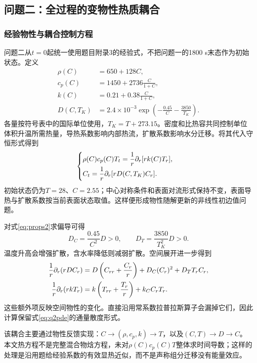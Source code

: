 \subsection{问题二：全过程的变物性热质耦合}
\subsubsection{经验物性与耦合控制方程}
问题二从$t=0$起统一使用题目附录3的经验式，不把问题一的1800 s末态作为初始状态。定义
\begin{equation}
\begin{aligned}
\rho(C)&=650+128C,\\
c_p(C)&=1450+2736\frac{C}{1+C},\\
k(C)&=0.21+0.38\frac{C}{1+C},\\
D(C,T_K)&=2.4\times10^{-3}
\exp\left(-\frac{0.45}{C}-\frac{3850}{T_K}\right).
\end{aligned}
\label{eq:props2}
\end{equation}
各量按符号表中的国际单位使用，$T_K=T+273.15$。密度和比热容共同控制单位体积升温所需热量，导热系数影响内部热流，扩散系数影响水分迁移。将其代入守恒形式得到
\begin{equation}
\begin{cases}
\rho(C)c_p(C)T_t=\dfrac1r\partial_r[rk(C)T_r],\\[4pt]
C_t=\dfrac1r\partial_r[rD(C,T_K)C_r].
\end{cases}
\label{eq:q2pde}
\end{equation}
初始状态仍为$T=28$、$C=2.55$；中心对称条件和表面对流形式保持不变，表面导热与扩散系数按当前表面状态取值。这样便形成物性随解更新的非线性初边值问题。

对式\eqref{eq:props2}求偏导可得
\begin{equation}
D_C=\frac{0.45}{C^2}D>0,\qquad
D_T=\frac{3850}{T_K^2}D>0.
\end{equation}
温度升高会增强扩散，含水率降低则减弱扩散。空间展开进一步得到
\begin{equation}
\begin{aligned}
\frac1r\partial_r(rDC_r)
&=D\left(C_{rr}+\frac{C_r}{r}\right)
+D_C(C_r)^2+D_TT_rC_r,\\
\frac1r\partial_r(rkT_r)
&=k\left(T_{rr}+\frac{T_r}{r}\right)+k_C C_rT_r .
\end{aligned}
\end{equation}
这些额外项反映空间物性的变化。直接沿用常系数拉普拉斯算子会漏掉它们，因此计算保留式\eqref{eq:q2pde}的通量散度形式。

该耦合主要通过物性反馈实现：$C\rightarrow(\rho,c_p,k)\rightarrow T$，以及$(C,T)\rightarrow D\rightarrow C$。本文热方程不是完整混合物焓方程，未对$\rho(C)c_p(C)T$整体求时间导数；这样的处理是沿用题给经验系数的有效显热近似，而不是声称组分迁移没有能量效应。

